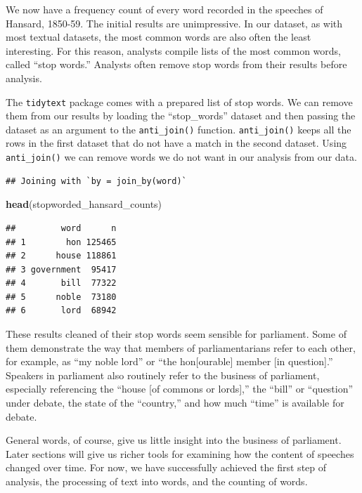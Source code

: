 \documentclass[
]{article}
\newenvironment{Shaded}{\begin{snugshade}}{\end{snugshade}}
\newcommand{\FunctionTok}[1]{\textcolor[rgb]{0.13,0.29,0.53}{\textbf{#1}}}
\newcommand{\NormalTok}[1]{#1}
\begin{document}
We now have a frequency count of every word recorded in the speeches of
Hansard, 1850-59. The initial results are unimpressive. In our dataset,
as with most textual datasets, the most common words are also often the
least interesting. For this reason, analysts compile lists of the most
common words, called ``stop words.'' Analysts often remove stop words
from their results before analysis.

The \texttt{tidytext} package comes with a prepared list of stop words.
We can remove them from our results by loading the ``stop\_words''
dataset and then passing the dataset as an argument to the
\texttt{anti\_join()} function. \texttt{anti\_join()} keeps all the rows
in the first dataset that do not have a match in the second dataset.
Using \texttt{anti\_join()} we can remove words we do not want in our
analysis from our data.

\begin{verbatim}
## Joining with `by = join_by(word)`
\end{verbatim}

\begin{Shaded}
\begin{Highlighting}[]
\FunctionTok{head}\NormalTok{(stopworded\_hansard\_counts)}
\end{Highlighting}
\end{Shaded}

\begin{verbatim}
##         word      n
## 1        hon 125465
## 2      house 118861
## 3 government  95417
## 4       bill  77322
## 5      noble  73180
## 6       lord  68942
\end{verbatim}

These results cleaned of their stop words seem sensible for parliament.
Some of them demonstrate the way that members of parliamentarians refer
to each other, for example, as ``my noble lord'' or ``the
hon{[}ourable{]} member {[}in question{]}.'' Speakers in parliament also
routinely refer to the business of parliament, especially referencing
the ``house {[}of commons or lords{]},'' the ``bill'' or ``question''
under debate, the state of the ``country,'' and how much ``time'' is
available for debate.

General words, of course, give us little insight into the business of
parliament. Later sections will give us richer tools for examining how
the content of speeches changed over time. For now, we have successfully
achieved the first step of analysis, the processing of text into words,
and the counting of words.
\end{document}
